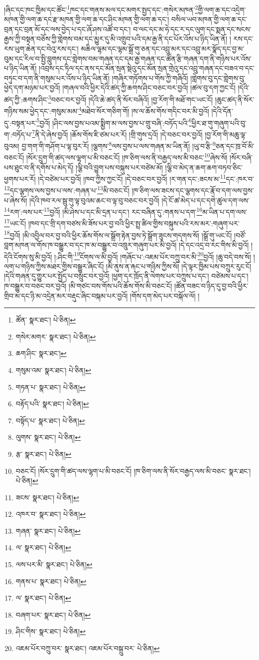 །ཞིང་དང་ཁང་ཁྱིམ་དང་ཚོང་\footnote{ཚོན་  སྣར་ཐང་།  པེ་ཅིན། }ཁང་དང་གནས་མལ་དང་མགར་སྤྱད་དང་:གསེར་མཁན་\footnote{གསེར་མགར་  སྣར་ཐང་།  པེ་ཅིན། }གྱི་ལག་ཆ་དང་འདྲེག་མཁན་གྱི་ལག་ཆ་དང་རྫ་མཁན་གྱི་ལག་ཆ་དང་ཤིང་མཁན་གྱི་ལག་ཆ་དང་། བསིལ་ཡབ་མཁན་གྱི་ལག་ཆ་དང་བྲན་དང་བྲན་མོ་དང་ལས་བྱེད་པ་དང་ཞོ་ཤས་འཚོ་བ་དང་། བ་ལང་དང་མ་ཧེ་དང་ར་དང་ལུག་དང་སྨན་དང་སངས་རྒྱས་ཀྱི་བསྟན་བཅོས་ཀྱི་གླེགས་བམ་དང་མྱུར་དུ་མི་འགྲུབ་པའི་དམ་རྒྱ་ནི་དང་པོར་འོས་པ་ཉིད་ཡིན་ནོ། །
རས་དང་རས་ཡུག་ཆེན་དང་བེའུ་རས་དང་། མཆིལ་ལྷམ་དང་ལྷམ་སྒྲོ་གུ་ཅན་དང་འབྲུ་མར་དང་འབྲུ་མར་སྣོད་དང་བྱ་མ་བུམ་དང་རིལ་བ་སྤྱི་བླུགས་དང་གླེགས་བམ་གཞན་དང་དམ་རྒྱ་གཞན་དང་ཚོན་རྩི་གཞན་དག་ནི་གཉིས་པར་འོས་པ་ཉིད་ཡིན་ནོ། །འབྲས་དང་ཏིལ་དང་ནས་དང་མོན་སྲན་སྡེའུ་དང་མོན་སྲན་གྲེའུ་དང་འབྲུ་གཞན་དང་བཟའ་བ་དང་བཏུང་བ་དག་ནི་གསུམ་པར་འོས་པ་ཉིད་ཡིན་ནོ། །གཞིར་གཏོགས་པ་གོས་ཀྱི་གཞིའོ། །གླེགས་བུ་དང་གླེགས་བུ་ཕྱེད་དག་མཉམ་པར་བྱའོ། །གཞལ་བའི་ཕྱིར་དེའི་ཚད་ཀྱི་ཆགས་ཤིང་བཅང་བར་བྱའོ། །ཚལ་བུ་དག་ཀྱང་ངོ། །དེའི་ཚད་ཀྱི་:ཆགས་ཤིང་\footnote{ཆག་ཤིང་  སྣར་ཐང་། }བཅང་བར་བྱའོ། །དེའི་ཆེ་ཚད་ནི་སོར་བཞིའོ། །བྱ་རོག་གི་མཐོ་གང་ཡང་ངོ། །ཆུང་ཚད་ནི་སོར་གཉིས་སམ་ཕྱེད་དང་:གསུམ་མམ་\footnote{གསུམ་འམ་  སྣར་ཐང་།  པེ་ཅིན། }མཐེབ་སོར་གཅིག་གོ། །ས་ལ་ཆོས་གོས་གདིང་བར་མི་བྱའོ། །དེའི་དོན་དུ་:བསྟན་པར་\footnote{གཏན་པ་  སྣར་ཐང་།  པེ་ཅིན། }བྱའོ། །ཤིང་ལས་བྱས་པའམ་སྨྱིག་མ་ལས་བྱས་པ་གྲུ་བཞི་:བཏོད་པའི་\footnote{བརྟོད་པའི་  སྣར་ཐང་།  པེ་ཅིན། }ཕྱིར་ཐ་གུ་གཞུག་པའི་བུ་ག་:བཏོད་པ་\footnote{བསྟོད་པ་  སྣར་ཐང་།  པེ་ཅིན། }ནི་དེ་ཞེས་བྱའོ། །ཆོས་གོས་ཇི་ཙམ་པར་རོ། །གྲི་གུས་དྲའོ། །དེ་བཅང་བར་བྱའོ། །བྱ་རོག་གི་མཆུ་ལྟ་བུའམ། བྱ་གག་གི་གཤོག་པ་ལྟ་བུར་རོ། །ལྕགས་\footnote{ལུགས་  སྣར་ཐང་།  པེ་ཅིན། }ལས་བྱས་པ་ལས་གཞན་མ་ཡིན་ནོ། །ཡུ་བ་རྩི་\footnote{རྩ་  སྣར་ཐང་།  པེ་ཅིན། }ཅན་དང་ཁྲ་བོ་མི་བཅང་ངོ། །སོར་དྲུག་གི་ཚད་ལས་ལྷག་པ་མི་བཅང་ངོ། །ཁ་ཅིག་ལས་ནི་བརྒྱད་ལས་མི་བཅང་\footnote{བཅང་ངོ། །སོར་དྲུག་གི་ཚད་ལས་ལྷག་པ་མི་བཅང་ངོ། །ཁ་ཅིག་ལས་ནི་སོར་བརྒྱད་ལས་མི་བཅང་  སྣར་ཐང་།  པེ་ཅིན། }ཞེས་སོ། །སོར་བཞི་པས་ཐུང་བ་ནི་དགོས་པ་མེད་དོ། །ལྕི་བའི་བྱུག་པས་བསྐུས་པར་བཙེམ་མོ། །ལྕི་བ་མེད་ན་ཆག་ཆག་བཏབ་ཅིང་ཕྱགས་པར་རོ། །དེ་བཙེམ་པར་བྱའོ། །ཁབ་ཀྱིས་ཀྱང་ངོ། །དེ་བཅང་བར་བྱའོ། །ར་གན་དང་:ཟངས་མ་\footnote{ཟངས་  སྣར་ཐང་།  པེ་ཅིན། }དང་:ཁར་བ་\footnote{འཁར་བ་  སྣར་ཐང་།  པེ་ཅིན། }དང་ལྕགས་ལས་བྱས་པ་ལས་:གཞན་པ་\footnote{གཞན་  སྣར་ཐང་།  པེ་ཅིན། }མི་བཅང་ངོ། །ཁ་ཅིག་ལས་ཟངས་དང་ལྕགས་དང་རྣོ་བ་དག་ལས་བྱས་པ་ཞེས་སོ། །དེའི་ཁབ་རལ་སྦུ་གུ་ལྟ་བུའམ་ཆང་བ་ལྟ་བུ་བཅང་བར་བྱའོ། །དེ་ངོ་ཚ་མེད་པ་དང་དགེ་ཚུལ་དག་ལས་\footnote{ལ་  སྣར་ཐང་།  པེ་ཅིན། }རག་:ལས་པར་\footnote{ལས་པར་མི་  སྣར་ཐང་།  པེ་ཅིན། }བྱའོ། །མི་ཤེས་པ་དང་མི་དྲན་པ་དང་། རང་བཞིན་དུ་:གནས་པ་དག་\footnote{གནས་པ་  སྣར་ཐང་།  པེ་ཅིན། }མ་ཡིན་པ་དག་ལས་\footnote{ལ་  སྣར་ཐང་།  པེ་ཅིན། }ཡང་ངོ། །ཁབ་དང་གྲི་དག་བཙས་མི་ཟོས་པར་བྱ་བའི་ཕྱིར་སྤྲ་ཚིལ་གྱིས་བསྐུས་པའི་རས་མར་:གཞུག་པར་\footnote{བཞག་པར་  སྣར་ཐང་།  པེ་ཅིན། }བྱའོ། །མི་འབྱིལ་བར་བྱ་བའི་ཕྱིར་ཆོས་གོས་ལ་སྒྲོག་རྟེན་བྱས་ཏེ་སྒྲོག་ཟུངས་གདགས་སོ། །སྒྲོ་གུ་ཡང་ངོ། །བཙོ་བླག་མཁན་ལ་གོས་ཁ་བསྒྱུར་བ་དང་ཁ་མ་བསྒྱུར་བ་འཁྲུར་གཞུག་པར་མི་བྱའོ། །དེ་དང་འདྲ་བ་རང་གིས་མི་བྱའོ། །དེའི་ངོགས་སུ་མི་བྱའོ། །:ཤིང་གི་\footnote{ཤིང་གིས་  སྣར་ཐང་།  པེ་ཅིན། }ངོགས་ལ་མི་བྱའོ། །གཞོང་པ་:འཇམ་པོར་བཀྲུ་བར་མི་\footnote{འཇམ་པོར་བཀྲུ་བར་  སྣར་ཐང་། འཇམ་པོར་བསྐྲུ་བར་  པེ་ཅིན། }བྱའོ། །ཆུ་བདེ་བས་སོ། །ལག་པ་གཉིས་ཀྱིས་མཐར་གྱིས་བསྒྱུར་ཞིང་ངོ། །མི་ནུས་ན་རྐང་པ་གཉིས་ཀྱིས་སོ། །དེ་ལྟར་ཁྱིམ་པས་བཀྲུར་རུང་ངོ། །དེའི་གཞན་དུ་གྱུར་པར་སྤྱོད་པ་བསྲུང་བར་བྱའོ། །ཕྱག་དར་ཁྲོད་ནི་ལེགས་པར་བཀྲུས་པ་དང་། བཙེམས་པ་དང་། ཁ་བསྒྱུར་བ་བཅང་བར་བྱའོ། །མི་གཙང་བས་གོས་པའི་ཆོས་གོས་མི་བཅང་ངོ། །ཚོན་བཟང་བ་ཉིད་དུ་བྱ་བའི་ཕྱིར་གྲིབ་མ་དང་ཉི་མ་འདྲེན་མར་བརྡུང་ཞིང་བསྐམ་པར་བྱའོ། །གོས་དག་མེད་པར་བསྐོལ་ལོ། །
